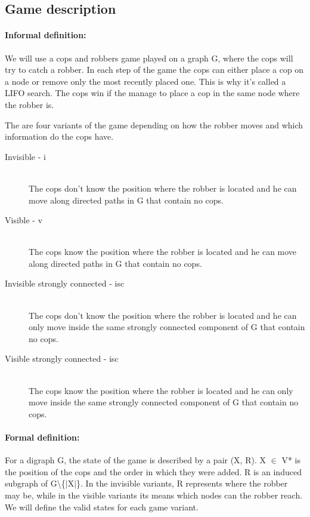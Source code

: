 \subsection{Game description}
\paragraph{Informal definition:}
We will use a cops and robbers game played on a graph G, where the cops will try to catch a robber. In each step of the game the cops can either place a cop on a node or remove only the most recently placed one. This is why it's called a LIFO search. The cops win if the manage to place a cop in the same node where the robber is.

The are four variants of the game depending on how the robber moves and which information do the cops have. 
\begin{description}
\item[Invisible - i] \hfill \\
The cops don't know the position where the robber is located and he can move along directed paths in G that contain no cops.
\item[Visible - v] \hfill \\
The cops know the position where the robber is located and he can move along directed paths in G that contain no cops.
\item[Invisible strongly connected - isc] \hfill \\
The cops don't know the position where the robber is located and he can only move inside the same strongly connected component of G that contain no cops.
\item[Visible strongly connected - isc] \hfill \\
The cops know the position where the robber is located and he can only move inside the same strongly connected component of G that contain no cops.
\end{description}

\paragraph{Formal definition:}
For a digraph G, the state of the game is described by a pair (X, R). X $\in$ V* is the position of the cops and the order in which they were added. R is an induced subgraph of G\textbackslash \{$|$X$|$\}. In the invisible variants, R represents where the robber may be, while in the visible variants its means which nodes can the robber reach. We will define the valid states for each game variant.

